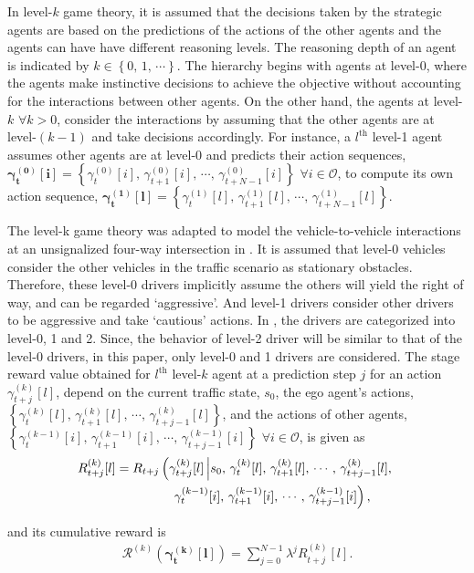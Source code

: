 \documentclass[10pt,journal]{IEEEtran}
\newcommand{\nth}[1]{$#1^{\textrm{th}}$}
\newcommand{\actseqk}[2]{\boldsymbol{\gamma^{\left(#2\right)}_{t}[#1]} = \left\{\gamma^{\left(#2\right)}_{t}[#1],\,\gamma^{\left(#2\right)}_{t+1}[#1],\,\cdots,\,\gamma^{\left(#2\right)}_{t+N-1}[#1]\right\}}
\newcommand{\actk}[3]{\gamma^{\left(#2\right)}_{#3}[#1]}
\newcommand{\actseqkt}[3]{\left\{\gamma^{\left(#2\right)}_{t}[#1],\,\gamma^{\left(#2\right)}_{t+1}[#1],\,\cdots,\,\gamma^{\left(#2\right)}_{t+#3}[#1]\right\}}
\newcommand{\actseqktnopar}[3]{\gamma^{\left(#2\right)}_{t}[#1],\,\gamma^{\left(#2\right)}_{t+1}[#1],\,\cdots,\,\gamma^{\left(#2\right)}_{t+#3}[#1]}
\begin{document}
	In level-$k$ game theory, it is assumed that the decisions taken by the strategic agents are based on the predictions of the actions of the other agents and the agents can have have different reasoning levels. The reasoning depth of an agent is indicated by $k \in \left\{0,\,1,\,\cdots\right\}$. The hierarchy begins with agents at level-0, where the agents make instinctive decisions to achieve the objective without accounting for the interactions between other agents. On the other hand, the agents at level-$k$ $\forall k>0$, consider the interactions by assuming that the other agents are at level-$(k-1)$ and take decisions accordingly. For instance, a \nth{l} level-1 agent assumes other agents are at level-0 and predicts their action sequences, $\actseqk{i}{0}$ $\forall i \in \mathcal{O}$, to compute its own action sequence, $\actseqk{l}{1}$.
	
	The level-k game theory was adapted to model the vehicle-to-vehicle interactions at an unsignalized four-way intersection in \cite{Li2018}. It is assumed that level-0 vehicles consider the other vehicles in the traffic scenario as stationary obstacles. Therefore, these level-0 drivers implicitly assume the others will yield the right of way, and can be regarded `aggressive'. And level-1 drivers consider other drivers to be aggressive and take `cautious' actions. In \cite{Li2018}, the drivers are categorized into level-0, 1 and 2. Since, the behavior of level-2 driver will be similar to that of the level-0 drivers, in this paper, only level-0 and 1 drivers are considered. The stage reward value obtained for \nth{l} level-$k$ agent at a prediction step $j$ for an action $\actk{l}{k}{t+j}$, depend on the current traffic state, $s_0$, the ego agent's actions, $\actseqkt{l}{k}{j-1}$, and the actions of other agents, $\actseqkt{i}{k-1}{j-1}$ $\forall i \in \mathcal{O}$, is given as
	\begin{align}
		R_{t+j}^{(k)}[l] = R_{t+j} & \left( \actk{l}{k}{t+j}  \left| s_0,\, \actseqktnopar{l}{k}{j-1},\right.\right. \nonumber\\
		& \hspace{0.25cm} \left.\,\actseqktnopar{i}{k-1}{j-1}\right),
		\label{eq:stage_reward_multi}
	\end{align}
	
	\noindent and its cumulative reward is
	\begin{align}
		\mathcal{R}^{(k)}\left(\boldsymbol{\gamma_{t}^{(k)}[l]}\right) = \sum_{j=0}^{N-1} \lambda^{j} R_{t+j}^{(k)}[l].
		\label{eq:cum_reward_multi}
	\end{align}
\end{document}
